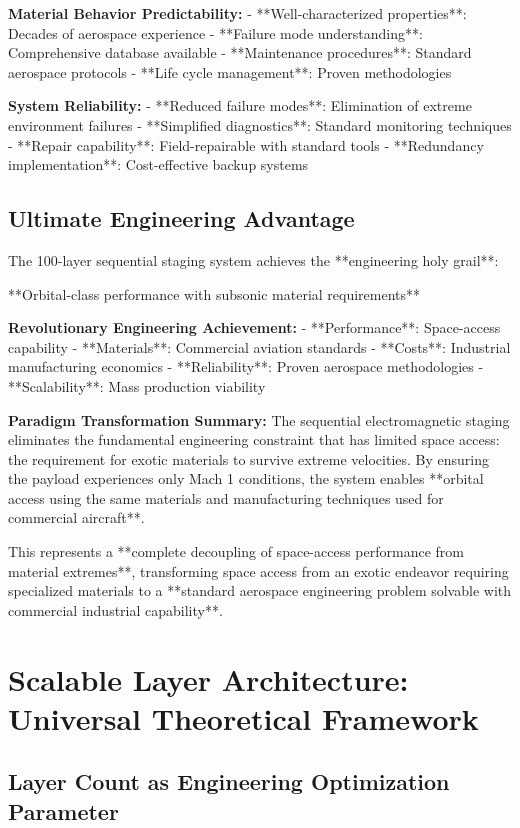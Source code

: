\documentclass[12pt,a4paper]{article}
\begin{document}
\textbf{Material Behavior Predictability:}
- **Well-characterized properties**: Decades of aerospace experience
- **Failure mode understanding**: Comprehensive database available
- **Maintenance procedures**: Standard aerospace protocols
- **Life cycle management**: Proven methodologies

\textbf{System Reliability:}
- **Reduced failure modes**: Elimination of extreme environment failures
- **Simplified diagnostics**: Standard monitoring techniques
- **Repair capability**: Field-repairable with standard tools
- **Redundancy implementation**: Cost-effective backup systems

\subsection{Ultimate Engineering Advantage}

The 100-layer sequential staging system achieves the **engineering holy grail**:

**Orbital-class performance with subsonic material requirements**

\textbf{Revolutionary Engineering Achievement:}
- **Performance**: Space-access capability
- **Materials**: Commercial aviation standards
- **Costs**: Industrial manufacturing economics
- **Reliability**: Proven aerospace methodologies
- **Scalability**: Mass production viability

\textbf{Paradigm Transformation Summary:}
The sequential electromagnetic staging eliminates the fundamental engineering constraint that has limited space access: the requirement for exotic materials to survive extreme velocities. By ensuring the payload experiences only Mach 1 conditions, the system enables **orbital access using the same materials and manufacturing techniques used for commercial aircraft**.

This represents a **complete decoupling of space-access performance from material extremes**, transforming space access from an exotic endeavor requiring specialized materials to a **standard aerospace engineering problem solvable with commercial industrial capability**.

\section{Scalable Layer Architecture: Universal Theoretical Framework}

\subsection{Layer Count as Engineering Optimization Parameter}
\end{document}
